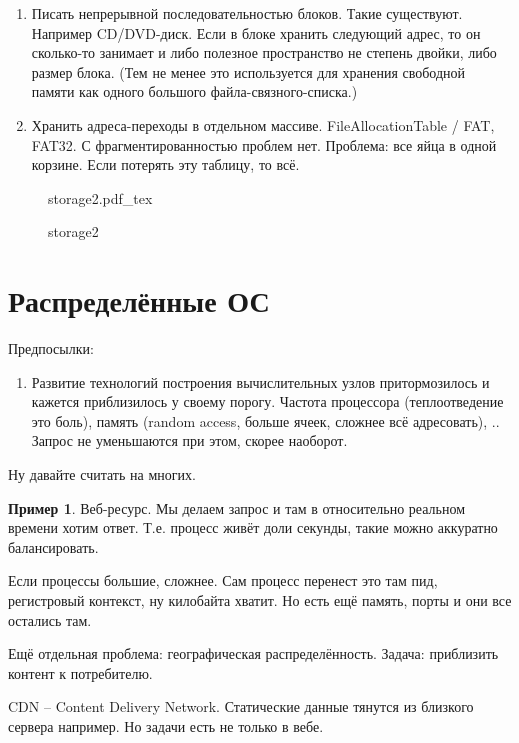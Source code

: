 \documentclass{book}
\theoremstyle{definition}
\newtheorem*{example}{Пример}
\newcommand{\incfig}[1]{%
    \def\svgwidth{\columnwidth}
    {#1.pdf_tex}
}
\begin{document}
\begin{enumerate}
    \item Писать непрерывной последовательностью блоков. Такие существуют. Например CD/DVD-диск. Если в блоке хранить следующий адрес, то он сколько-то занимает и либо полезное пространство не степень двойки, либо размер блока. (Тем не менее это используется для хранения свободной памяти как одного большого файла-связного-списка.)
    \item Хранить адреса-переходы в отдельном массиве. FileAllocationTable / FAT, FAT32. С фрагментированностью проблем нет. Проблема: все яйца в одной корзине. Если потерять эту таблицу, то всё.
\end{enumerate}


\begin{figure}[!ht]
    \centering
    \incfig{storage2}
    \caption{storage2}
    \label{fig:storage2}
\end{figure}

\section{Распределённые ОС}

Предпосылки:
\begin{enumerate}
    \item Развитие технологий построения вычислительных узлов притормозилось и кажется приблизилось у своему порогу. Частота процессора (теплоотведение это боль), память (random access, больше ячеек, сложнее всё адресовать), .. Запрос не уменьшаются при этом, скорее наоборот.
\end{enumerate}

Ну давайте считать на многих.

\begin{example}
    Веб-ресурс. Мы делаем запрос и там в относительно реальном времени хотим ответ. Т.е. процесс живёт доли секунды, такие можно аккуратно балансировать.
\end{example}

Если процессы большие, сложнее. Сам процесс перенест это там пид, регистровый контекст, ну килобайта хватит. Но есть ещё память, порты и они все остались там. 

Ещё отдельная проблема: географическая распределённость. Задача: приблизить контент к потребителю.

CDN -- Content Delivery Network. Статические данные тянутся из близкого сервера например. Но задачи есть не только в вебе.
\end{document}
